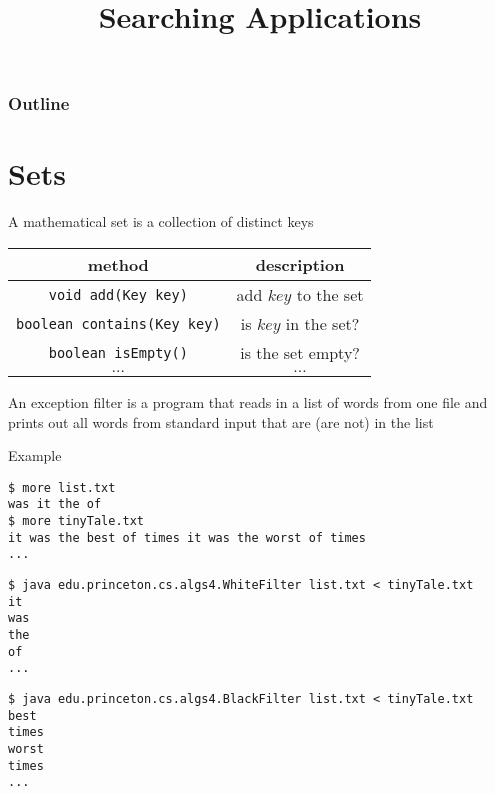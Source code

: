 \documentclass[8pt,a4paper,compress]{beamer}
\title{Searching Applications}
\date{}
\begin{document}
\begin{frame}
\vfill
\titlepage
\end{frame}

\begin{frame}
\frametitle{Outline}
\tableofcontents
\end{frame}

\section{Sets}
\begin{frame}[fragile]
\pause

A mathematical set is a collection of distinct keys
\begin{center}
\begin{tabular}{cc}
method & description \\ \hline
\lstinline$void add(Key key)$ & add $key$ to the set \\
\lstinline$boolean contains(Key key)$ & is $key$ in the set? \\
\lstinline$boolean isEmpty()$ & is the set empty? \\
$\dots$ & $\dots$
\end{tabular}
\end{center}

\pause
\bigskip

An exception filter is a program that reads in a list of words from one file and prints out all words from standard input that are (are not) in the list

\pause
\bigskip

Example
\begin{lstlisting}[language={}]
$ more list.txt
was it the of
$ more tinyTale.txt
it was the best of times it was the worst of times
...
\end{lstlisting}

\begin{lstlisting}[language={}]
$ java edu.princeton.cs.algs4.WhiteFilter list.txt < tinyTale.txt 
it 
was 
the 
of 
...
\end{lstlisting}

\begin{lstlisting}[language={}]
$ java edu.princeton.cs.algs4.BlackFilter list.txt < tinyTale.txt
best 
times 
worst 
times
...
\end{lstlisting}
\end{frame}
\end{document}

